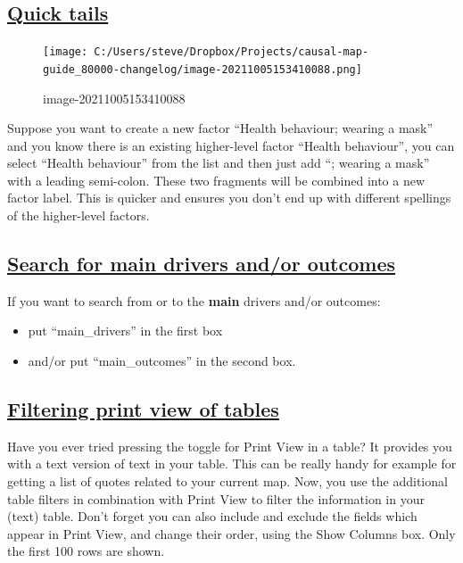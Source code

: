 \documentclass[
]{book}
\providecommand{\tightlist}{%
  \setlength{\itemsep}{0pt}\setlength{\parskip}{0pt}}
\begin{document}
\hypertarget{quick-tails}{%
\subsection{\texorpdfstring{\protect\hyperlink{xquick-tails}{Quick tails}}{Quick tails}}\label{quick-tails}}

\begin{figure}
\centering
\texttt{[image: C:/Users/steve/Dropbox/Projects/causal-map-guide\_80000-changelog/image-20211005153410088.png]}
\caption{image-20211005153410088}
\end{figure}

Suppose you want to create a new factor ``Health behaviour; wearing a mask'' and you know there is an existing higher-level factor ``Health behaviour'', you can select ``Health behaviour'' from the list and then just add ``; wearing a mask'' with a leading semi-colon. These two fragments will be combined into a new factor label. This is quicker and ensures you don't end up with different spellings of the higher-level factors.

\hypertarget{search-for-main-drivers-andor-outcomes}{%
\subsection{\texorpdfstring{\protect\hyperlink{howtotracepathsandrobustness}{Search for main drivers and/or outcomes}}{Search for main drivers and/or outcomes}}\label{search-for-main-drivers-andor-outcomes}}

If you want to search from or to the \textbf{main} drivers and/or outcomes:

\begin{itemize}
\tightlist
\item
  put ``main\_drivers'' in the first box
\item
  and/or put ``main\_outcomes'' in the second box.
\end{itemize}

\hypertarget{filtering-print-view-of-tables-1}{%
\subsection{\texorpdfstring{\protect\hyperlink{xprint-view-tables}{Filtering print view of tables}}{Filtering print view of tables}}\label{filtering-print-view-of-tables-1}}

Have you ever tried pressing the toggle for Print View in a table? It provides you with a text version of text in your table. This can be really handy for example for getting a list of quotes related to your current map. Now, you use the additional table filters in combination with Print View to filter the information in your (text) table. Don't forget you can also include and exclude the fields which appear in Print View, and change their order, using the Show Columns box. Only the first 100 rows are shown.
\end{document}
